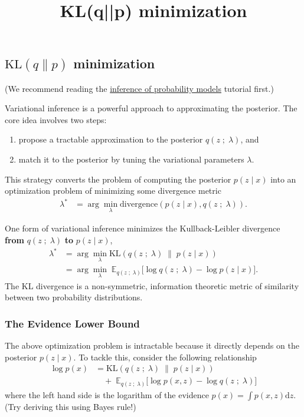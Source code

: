 \title{KL(q||p) minimization}

\subsection{$\text{KL}(q\|p)$ minimization}

(We recommend reading the 
\href{tut_inference_probability_models.html}{inference of probability models}
tutorial first.)

Variational inference is a powerful approach to approximating the posterior. The
core idea involves two steps:
\begin{enumerate}
   \item propose a tractable approximation to the posterior $q(z\;;\;\lambda)$,
   and
   \item match it to the posterior by tuning the variational
   parameters $\lambda$.
 \end{enumerate} 
This strategy converts the problem of computing the posterior $p(z \mid x)$ into
an optimization problem of minimizing some divergence metric
\begin{align*}
  \lambda^* 
  &=
  \arg\min_\lambda \text{divergence}( 
  p(z \mid x)
  ,
  q(z\;;\;\lambda)
  ).
\end{align*}

One form of variational inference minimizes the Kullback-Leibler divergence 
\textbf{from} $q(z\;;\;\lambda)$ \textbf{to} $p(z \mid x)$,
\begin{align*}
  \lambda^* 
  &=
  \arg\min_\lambda \text{KL}( 
  q(z\;;\;\lambda)
  \;\|\;
  p(z \mid x)
  )\\
  &=
  \arg\min_\lambda\;
  \mathbb{E}_{q(z\;;\;\lambda)}
  \big[
  \log q(z\;;\;\lambda)
  -
  \log p(z \mid x)
  \big].
\end{align*}
The KL divergence is a non-symmetric, information theoretic metric of
similarity between two probability distributions. 

\subsubsection{The Evidence Lower Bound}

The above optimization problem is intractable because it directly depends on the
posterior $p(z \mid x)$. To tackle this, consider the following relationship
\begin{align*}
  \log p(x)
  &=
  \text{KL}( 
  q(z\;;\;\lambda)
  \;\|\;
  p(z \mid x)
  )\\
  &\quad+\;
  \mathbb{E}_{q(z\;;\;\lambda)}
  \big[
  \log p(x, z)
  -
  \log q(z\;;\;\lambda)
  \big]
\end{align*}
where the left hand side is the logarithm of the evidence 
$p(x) = \int p(x,z) \text{d}z$. (Try deriving this using Bayes rule!)

